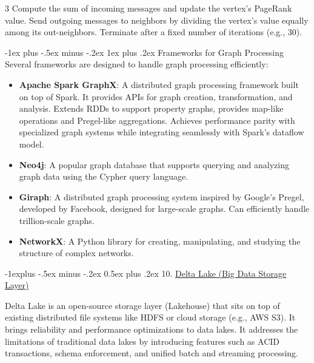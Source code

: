 \documentclass[a4paper, 9pt, landscape]{article}
\makeatletter
\renewcommand{\subsection}{\@startsection{subsection}{2}{0mm}%
                                {-1explus -.5ex minus -.2ex}%
                                {0.5ex plus .2ex}%
                                {\normalfont\normalsize\bfseries}}
\renewcommand{\subsubsection}{\@startsection{subsubsection}{3}{0mm}%
                                {-1ex plus -.5ex minus -.2ex}%
                                {1ex plus .2ex}%
                                {\normalfont\small\bfseries}}
\makeatother
\begin{document}
\begin{multicols*}{3}
Compute the sum of incoming messages and update the vertex's PageRank value. Send outgoing messages to neighbors by dividing the vertex's value equally among its out-neighbors. Terminate after a fixed number of iterations (e.g., 30).


\subsubsection{Frameworks for Graph Processing}
Several frameworks are designed to handle graph processing efficiently:
\begin{itemize}
\item \textbf{Apache Spark GraphX}: A distributed graph processing framework built on top of Spark. It provides APIs for graph creation, transformation, and analysis. Extends RDDs to support property graphs, provides map-like operations and Pregel-like aggregations. Achieves performance parity with specialized graph systems while integrating seamlessly with Spark's dataflow model.
\item \textbf{Neo4j}: A popular graph database that supports querying and analyzing graph data using the Cypher query language.
\item \textbf{Giraph}: A distributed graph processing system inspired by Google's Pregel, developed by Facebook, designed for large-scale graphs. Can efficiently handle trillion-scale graphs.
\item \textbf{NetworkX}: A Python library for creating, manipulating, and studying the structure of complex networks.
\end{itemize}




\columnbreak

\subsection{10. \underline{Delta Lake (Big Data Storage Layer)}}

Delta Lake is an open-source storage layer (Lakehouse) that sits on top of existing distributed file systems like HDFS or cloud storage (e.g., AWS S3). It brings reliability and performance optimizations to data lakes. It addresses the limitations of traditional data lakes by introducing features such as ACID transactions, schema enforcement, and unified batch and streaming processing.


\end{multicols*}
\end{document}
